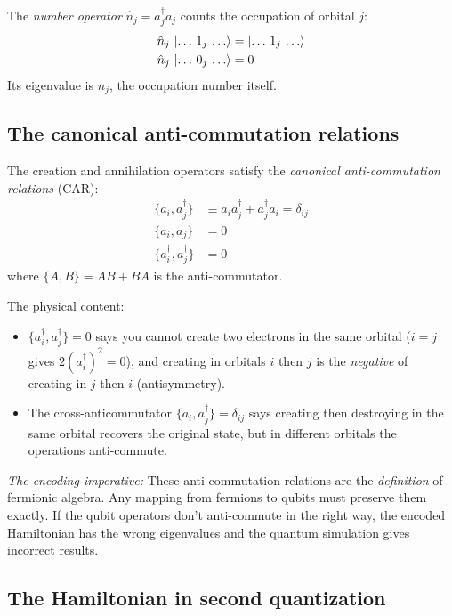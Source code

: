 \documentclass[aps,prb,preprint,longbibliography,nofootinbib]{revtex4-2}
\begin{document}
The \emph{number operator} $\hat{n}_j = a^\dagger_j a_j$ counts the
occupation of orbital $j$:
\begin{align}
\hat{n}_j \,\ket{\ldots\, 1_j\, \ldots} &= \ket{\ldots\, 1_j\, \ldots} \\
\hat{n}_j \,\ket{\ldots\, 0_j\, \ldots} &= 0
\end{align}
Its eigenvalue is $n_j$, the occupation number itself.

\subsection{The canonical anti-commutation relations}

The creation and annihilation operators satisfy the \emph{canonical
anti-commutation relations} (CAR):
\begin{align}
\{a_i, a^\dagger_j\} &\equiv a_i a^\dagger_j + a^\dagger_j a_i = \delta_{ij}
\label{eq:car1}\\
\{a_i, a_j\} &= 0
\label{eq:car2}\\
\{a^\dagger_i, a^\dagger_j\} &= 0
\label{eq:car3}
\end{align}
where $\{A, B\} = AB + BA$ is the anti-commutator.

The physical content:
\begin{itemize}
\item $\{a^\dagger_i, a^\dagger_j\} = 0$ says you cannot create two
  electrons in the same orbital ($i = j$ gives
  $2(a^\dagger_i)^2 = 0$), and creating in orbitals $i$ then $j$ is
  the \emph{negative} of creating in $j$ then $i$ (antisymmetry).
\item The cross-anticommutator $\{a_i, a^\dagger_j\} = \delta_{ij}$
  says creating then destroying in the same orbital recovers the
  original state, but in different orbitals the operations anti-commute.
\end{itemize}

\emph{The encoding imperative:}  These anti-commutation relations are
the \emph{definition} of fermionic algebra.  Any mapping from fermions
to qubits must preserve them exactly.  If the qubit operators don't
anti-commute in the right way, the encoded Hamiltonian has the wrong
eigenvalues and the quantum simulation gives incorrect results.

\subsection{The Hamiltonian in second quantization}
\end{document}
